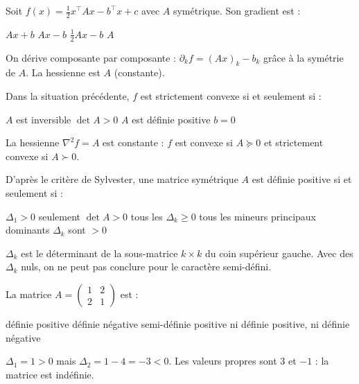 \begin{question}
Soit $f(x)=\frac12x^{\top}Ax-b^{\top}x+c$ avec $A$ symétrique. Son gradient est :
\begin{reponses}
  \mauvaise $Ax+b$
  \bonne $Ax-b$
  \mauvaise $\tfrac12Ax-b$
  \mauvaise $A$
\end{reponses}
\begin{explication}
On dérive composante par composante : $\partial_kf=(Ax)_k-b_k$ grâce à la symétrie de $A$. La hessienne est $A$ (constante).
\end{explication}
\end{question}

\begin{question}
Dans la situation précédente, $f$ est strictement convexe si et seulement si :
\begin{reponses}
  \mauvaise $A$ est inversible
  \mauvaise $\det A>0$
  \bonne $A$ est définie positive
  \mauvaise $b=0$
\end{reponses}
\begin{explication}
La hessienne $\nabla^2f=A$ est constante : $f$ est convexe si $A\succeq0$ et strictement convexe si $A\succ0$.
\end{explication}
\end{question}

\begin{question}
D'après le critère de Sylvester, une matrice symétrique $A$ est définie positive si et seulement si :
\begin{reponses}
  \mauvaise $\Delta_1>0$ seulement
  \mauvaise $\det A>0$
  \mauvaise tous les $\Delta_k\ge0$
  \bonne tous les mineurs principaux dominants $\Delta_k$ sont $>0$
\end{reponses}
\begin{explication}
$\Delta_k$ est le déterminant de la sous-matrice $k\times k$ du coin supérieur gauche. Avec des $\Delta_k$ nuls, on ne peut pas conclure pour le caractère semi-défini.
\end{explication}
\end{question}

\begin{question}
La matrice $A=\begin{pmatrix}1&2\\2&1\end{pmatrix}$ est :
\begin{reponses}
  \mauvaise définie positive
  \mauvaise définie négative
  \mauvaise semi-définie positive
  \bonne ni définie positive, ni définie négative
\end{reponses}
\begin{explication}
$\Delta_1=1>0$ mais $\Delta_2=1-4=-3<0$. Les valeurs propres sont $3$ et $-1$ : la matrice est indéfinie.
\end{explication}
\end{question}
